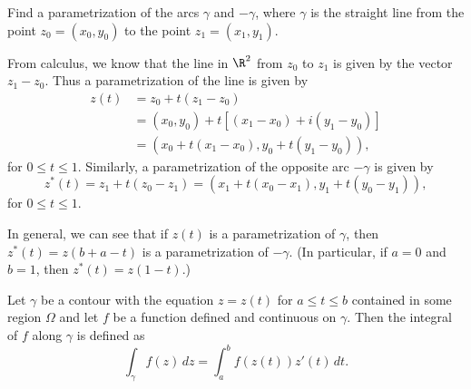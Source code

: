 \begin{example}
    Find a parametrization of the arcs \(\gamma\) and \(-\gamma\), where \(\gamma\) is the straight line from the point \(z_0 = (x_0, y_0)\) to the point \(z_1 = (x_1, y_1)\).

    \begin{solution}
        From calculus, we know that the line in \(\R^2\) from \(z_0\) to \(z_1\) is given by the vector \(z_1 - z_0\). Thus a parametrization of the line is given by
        \begin{align*}
            z(t) &= z_0 + t(z_1 - z_0) \\
            &= (x_0, y_0) + t[(x_1 - x_0) + i(y_1 - y_0)] \\
            &= (x_0 + t(x_1 - x_0), y_0 + t(y_1 - y_0)),
        \end{align*}
        for \(0 \leq t \leq 1\). Similarly, a parametrization of the opposite arc \(-\gamma\) is given by
        \[
            z^*(t) = z_1 + t(z_0 - z_1) = (x_1 + t(x_0 - x_1), y_1 + t(y_0 - y_1)),
        \]
        for \(0 \leq t \leq 1\).

        In general, we can see that if \(z(t)\) is a parametrization of \(\gamma\), then \(z^*(t) = z(b + a - t)\) is a parametrization of \(-\gamma\). (In particular, if \(a = 0\) and \(b = 1\), then \(z^*(t) = z(1 - t)\).)
    \end{solution}
\end{example}



\begin{definition}
    Let \(\gamma\) be a contour with the equation \(z = z(t)\) for \(a \leq t \leq b\) contained in some region \(\Omega\) and let \(f\) be a function defined and continuous on \(\gamma\). Then the integral of \(f\) along \(\gamma\) is defined as
    \[
        \int_\gamma f(z) \, dz = \int_a^b f(z(t)) z'(t) \, dt.
    \]
    \label{def:complex-integral-contour}
\end{definition}

